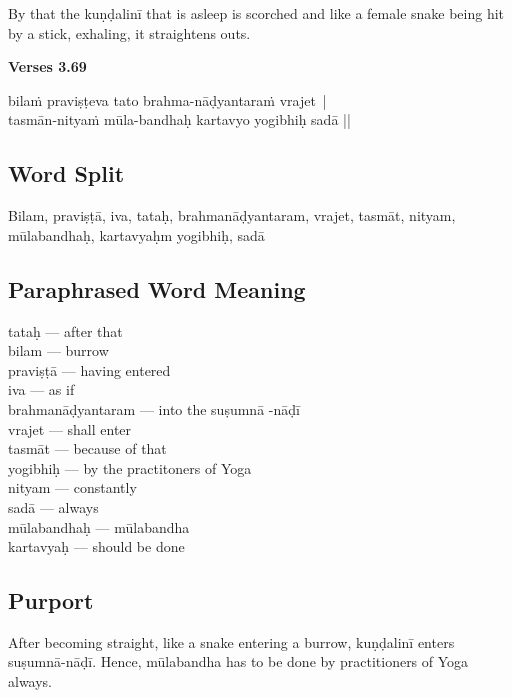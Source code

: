 By that the kuṇḍalinī that is asleep is scorched and like a female snake being hit by a stick, exhaling, it straightens outs. 
\newpage


\noindent \textbf{Verses 3.69}

\begin{shloka}
bilaṁ praviṣṭeva tato brahma-nāḍyantaraṁ vrajet |\\
tasmān-nityaṁ mūla-bandhaḥ kartavyo yogibhiḥ sadā ||
\end{shloka}

\subsection*{Word Split}

Bilam, praviṣṭā, iva, tataḥ, brahmanāḍyantaram, vrajet, tasmāt, nityam, mūlabandhaḥ, kartavyaḥm yogibhiḥ, sadā

\subsection*{Paraphrased Word Meaning}

\begin{multicols}{2}
tataḥ --- after that \\
bilam --- burrow \\
praviṣṭā --- having entered \\
iva --- as if \\
brahmanāḍyantaram --- into the suṣumnā -nāḍī\\
vrajet --- shall enter \\
tasmāt --- because of that \\
yogibhiḥ --- by the practitoners of Yoga \\
nityam --- constantly\\
sadā --- always\\
mūlabandhaḥ --- mūlabandha\\
kartavyaḥ --- should be done 
\end{multicols}

\subsection*{Purport}

After becoming straight, like a snake entering a burrow,   kuṇḍalinī enters suṣumnā-nāḍī. Hence, mūlabandha has to be done by practitioners of Yoga always.

